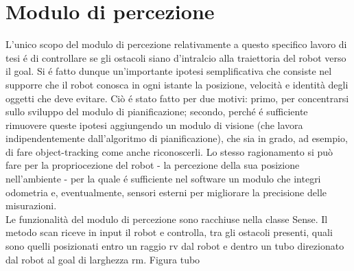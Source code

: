 \documentclass[14pt,a4paper]{extarticle}
\begin{document}
\section{Modulo di percezione}
L'unico scopo del modulo di percezione relativamente a questo specifico lavoro di tesi é di controllare se gli ostacoli siano d'intralcio alla traiettoria del robot verso il goal. Si é fatto dunque un'importante ipotesi semplificativa che consiste nel supporre che il robot conosca in ogni istante la posizione, velocità e identità degli oggetti che deve evitare. Ciò é stato fatto per due motivi: primo, per concentrarsi sullo sviluppo del modulo di pianificazione; secondo, perché é sufficiente rimuovere queste ipotesi aggiungendo un modulo di visione (che lavora indipendentemente dall'algoritmo di pianificazione), che sia in grado, ad esempio, di fare object-tracking come anche riconoscerli. Lo stesso ragionamento si può fare per la propriocezione del robot - la percezione della sua posizione nell'ambiente - per la quale é sufficiente nel software un modulo che integri odometria e, eventualmente, sensori esterni per migliorare la precisione delle misurazioni.\\
Le funzionalità del modulo di percezione sono racchiuse nella classe Sense. Il metodo scan riceve in input il robot e controlla, tra gli ostacoli presenti, quali sono quelli posizionati entro un raggio rv dal robot e dentro un tubo direzionato dal robot al goal di larghezza rm. 
Figura tubo
\end{document}
